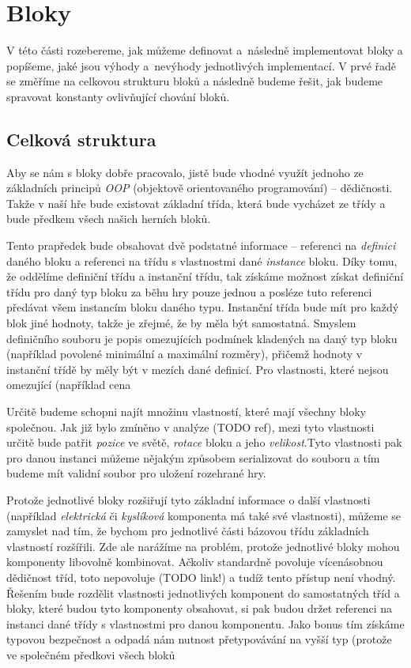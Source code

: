 
\section{Bloky}

V této části rozebereme, jak můžeme definovat a~následně implementovat bloky a popíšeme, jaké jsou výhody a~nevýhody jednotlivých implementací. V prvé řadě se změříme na celkovou strukturu bloků a následně budeme řešit, jak budeme spravovat konstanty ovlivňující chování bloků.

\subsection{Celková struktura}

Aby se nám s bloky dobře pracovalo, jistě bude vhodné využít jednoho ze základních principů \textit{OOP} (objektově orientovaného programování) -- dědičnosti. Takže v naší hře bude existovat základní třída, která bude vycházet ze třídy  a bude předkem všech našich herních bloků.

Tento prapředek bude obsahovat dvě podstatné informace -- referenci na \textit{definici} daného bloku a referenci na třídu s vlastnostmi dané \textit{instance} bloku. Díky tomu, že oddělíme definiční třídu a instanční třídu, tak získáme možnost získat definiční třídu pro daný typ bloku za běhu hry pouze jednou a posléze tuto referenci předávat všem instancím bloku daného typu. Instanční třída bude mít pro každý blok jiné hodnoty, takže je zřejmé, že by měla být samostatná. Smyslem definičního souboru je popis omezujících podmínek kladených na daný typ bloku (například povolené minimální a maximální rozměry), přičemž hodnoty v instanční třídě by měly být v mezích dané definicí. Pro vlastnosti, které nejsou omezující (například cena 

Určitě budeme schopni najít množinu vlastností, které mají všechny bloky společnou. Jak již bylo zmíněno v analýze (TODO ref), mezi tyto vlastnosti určitě bude patřit  \textit{pozice} ve světě, \textit{rotace} bloku a jeho \textit{velikost}.Tyto vlastnosti pak pro danou instanci můžeme nějakým způsobem serializovat do souboru a tím budeme mít validní soubor pro uložení rozehrané hry. 

Protože jednotlivé bloky rozšiřují tyto základní informace o další vlastnosti (například \textit{elektrická} či \textit{kyslíková} komponenta má také své vlastnosti), můžeme se zamyslet nad tím, že bychom pro jednotlivé části bázovou třídu základních vlastností rozšířili. Zde ale narážíme na problém, protože jednotlivé bloky mohou komponenty libovolně kombinovat. Ačkoliv \CPP{} standardně povoluje vícenásobnou dědičnost tříd, \UE{} toto nepovoluje (TODO link!) a tudíž tento přístup není vhodný. Řešením bude rozdělit vlastnosti jednotlivých komponent do samostatných tříd a bloky, které budou tyto komponenty obsahovat, si pak budou držet referenci na instanci dané třídy s vlastnostmi pro danou komponentu. Jako bonus tím získáme typovou bezpečnost a odpadá nám nutnost přetypovávání na vyšší typ (protože ve společném předkovi všech bloků


